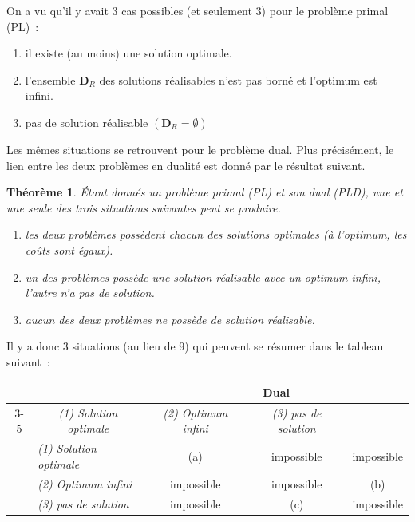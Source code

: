 \documentclass[a4paper,12pt,openany]{book}
\theoremstyle{plain}
\newtheorem{theorem}{Théorème}[section]
\theoremstyle{definition}
\theoremstyle{remark}
\theoremstyle{nbstyle}
\begin{document}
	On a vu qu'il y avait 3 cas possibles (et seulement 3) pour le problème primal (PL)~:
	
	\begin{enumerate}
		\item il existe (au moins) une solution optimale.
		\item l'ensemble $\mathbf{D}_{R}$ des solutions réalisables n'est pas borné et l'optimum est infini.
		\item pas de solution réalisable $\left(\mathbf{D}_{R}=\emptyset\right)$
	\end{enumerate}
	
	Les mêmes situations se retrouvent pour le problème dual. Plus précisément, le lien entre les deux problèmes en dualité est donné par le résultat suivant.
	
	\begin{theorem}
		Étant donnés un problème primal (PL) et son dual (PLD), une et une seule des trois situations suivantes peut se produire.
		\begin{enumerate}
			\item[(a)] les deux problèmes possèdent chacun des solutions optimales (à l'optimum, les coûts sont égaux).
			\item[(b)] un des problèmes possède une solution réalisable avec un optimum infini, l'autre n'a pas de solution.
			\item[(c)] aucun des deux problèmes ne possède de solution réalisable.
		\end{enumerate}
	\end{theorem}
	
	Il y a donc 3 situations (au lieu de 9) qui peuvent se résumer dans le tableau suivant~:
	
	\begin{center}
		\begin{tabular}{cc||c|c|c|}
			\multicolumn{2}{c||}{} & \multicolumn{3}{c|}{ \textbf{Dual} } \\
			\cline{3-5}
			\multicolumn{2}{c||}{} & \textit{(1) Solution optimale} & \textit{(2) Optimum infini} & \textit{(3) pas de solution} \\
			\hline \hline
			\multicolumn{1}{|c|}{\multirow{3}{*}{\rotatebox{90}{\textbf{Primal}}}} &
			\multicolumn{1}{|l||}{\textit{(1) Solution optimale}} & (a) & impossible & impossible \\
			\cline{2-5}
			\multicolumn{1}{|c|}{} &
			\multicolumn{1}{|l||}{\textit{(2) Optimum infini}} & impossible & impossible & (b) \\
			\cline{2-5}
			\multicolumn{1}{|c|}{} &
			\multicolumn{1}{|l||}{\textit{(3) pas de solution}} & impossible & (c) & impossible \\
			\hline
		\end{tabular}
	\end{center}
	
\end{document}
